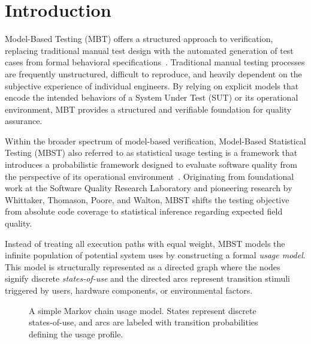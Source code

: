 \section{Introduction}%
\label{sec:introduction}

Model-Based Testing (MBT) offers a structured approach to verification, replacing traditional manual test design with the automated generation of test cases from formal behavioral specifications~\cite{taxonomy_mbt}. Traditional manual testing processes are frequently unstructured, difficult to reproduce, and heavily dependent on the subjective experience of individual engineers. By relying on explicit models that encode the intended behaviors of a System Under Test (SUT) or its operational environment, MBT provides a structured and verifiable foundation for quality assurance.

Within the broader spectrum of model-based verification, Model-Based Statistical Testing (MBST) also referred to as statistical usage testing is a framework that introduces a probabilistic framework designed to evaluate software quality from the perspective of its operational environment~\cite{whittaker1993markov,whittaker1994markov}. Originating from foundational work at the Software Quality Research Laboratory and pioneering research by Whittaker, Thomason, Poore, and Walton, MBST shifts the testing objective from absolute code coverage to statistical inference regarding expected field quality.

Instead of treating all execution paths with equal weight, MBST models the infinite population of potential system uses by constructing a formal \emph{usage model}. This model is structurally represented as a directed graph where the nodes signify discrete \emph{states-of-use} and the directed arcs represent transition stimuli triggered by users, hardware components, or environmental factors.

\begin{figure}[!t]
\centering
{}
\caption{A simple Markov chain usage model. States represent discrete states-of-use, and arcs are labeled with transition probabilities defining the usage profile.}%
\label{fig:markov_usage_model}
\end{figure}

